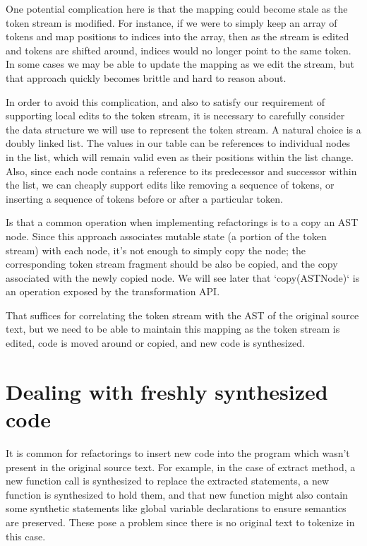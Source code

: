 One potential complication here is that the mapping could become stale as the
token stream is modified. For instance, if we were to simply keep an array of
tokens and map positions to indices into the array, then as the stream is
edited and tokens are shifted around, indices would no longer point to the same
token. In some cases we may be able to update the mapping as we edit the
stream, but that approach quickly becomes brittle and hard to reason about.

In order to avoid this complication, and also to satisfy our requirement of
supporting local edits to the token stream, it is necessary to carefully
consider the data structure we will use to represent the token stream. A
natural choice is a doubly linked list. The values in our table can be
references to individual nodes in the list, which will remain valid even as
their positions within the list change. Also, since each node contains a
reference to its predecessor and successor within the list, we can cheaply
support edits like removing a sequence of tokens, or inserting a sequence of
tokens before or after a particular token.

Is that a common operation when implementing refactorings is to a copy an AST
node. Since this approach associates mutable state (a portion of the token
stream) with each node, it's not enough to simply copy the node; the
corresponding token stream fragment should be also be copied, and the copy
associated with the newly copied node. We will see later that `copy(ASTNode)`
is an operation exposed by the transformation API.

That suffices for correlating the token stream with the AST of the original
source text, but we need to be able to maintain this mapping as the token
stream is edited, code is moved around or copied, and new code is synthesized.

\section{Dealing with freshly synthesized code}

It is common for refactorings to insert new code into the program which wasn't
present in the original source text. For example, in the case of extract
method, a new function call is synthesized to replace the extracted statements,
a new function is synthesized to hold them, and that new function might also
contain some synthetic statements like global variable declarations to ensure
semantics are preserved. These pose a problem since there is no original text
to tokenize in this case.

